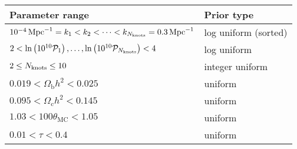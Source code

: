 \begin{tabular}{ll}
  Parameter range &
  Prior type
  \\
  \toprule
  \(10^{-4}\,\mathrm{Mpc}^{-1} = k_1< k_2 < \cdots < k_{N_\mathrm{knots}} = 0.3\,\mathrm{Mpc}^{-1}\) &
  log uniform (sorted)
  \\
  \( 2 < \ln\left(10^{10}\mathcal{P}_{1}\right), \ldots ,\ln\left(10^{10}\mathcal{P}_{{N_\mathrm{knots}}}\right) < 4 \)  &
  log uniform
  \\
  \(2\le N_\mathrm{knots} \le 10 \) &
  integer uniform
  \\
  \midrule
  \(0.019< \Omega_\mathrm{b} h^2 <0.025\) &
  uniform
  \\
  \(0.095< \Omega_\mathrm{c} h^2 <0.145\) &
  uniform
  \\
  \(1.03< 100\theta_\mathrm{MC} <1.05\) &
  uniform
  \\
  \(0.01< \tau< 0.4\) &
  uniform
  \\
  \bottomrule
\end{tabular}
